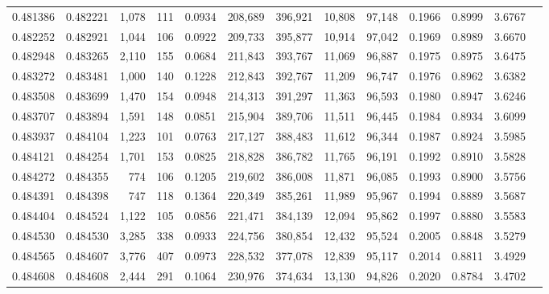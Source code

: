 \begin{tabular}{rrrrrrrrrrrrr}
0.481386 & 0.482221 & 1,078 &   111 &                                     0.0934 & 208,689 & 396,921 &  10,808 &  97,148 & 0.1966 & 0.8999 & 3.6767 \\
0.482252 & 0.482921 & 1,044 &   106 &                                     0.0922 & 209,733 & 395,877 &  10,914 &  97,042 & 0.1969 & 0.8989 & 3.6670 \\
0.482948 & 0.483265 & 2,110 &   155 &                                     0.0684 & 211,843 & 393,767 &  11,069 &  96,887 & 0.1975 & 0.8975 & 3.6475 \\
0.483272 & 0.483481 & 1,000 &   140 &                                     0.1228 & 212,843 & 392,767 &  11,209 &  96,747 & 0.1976 & 0.8962 & 3.6382 \\
0.483508 & 0.483699 & 1,470 &   154 &                                     0.0948 & 214,313 & 391,297 &  11,363 &  96,593 & 0.1980 & 0.8947 & 3.6246 \\
0.483707 & 0.483894 & 1,591 &   148 &                                     0.0851 & 215,904 & 389,706 &  11,511 &  96,445 & 0.1984 & 0.8934 & 3.6099 \\
0.483937 & 0.484104 & 1,223 &   101 &                                     0.0763 & 217,127 & 388,483 &  11,612 &  96,344 & 0.1987 & 0.8924 & 3.5985 \\
0.484121 & 0.484254 & 1,701 &   153 &                                     0.0825 & 218,828 & 386,782 &  11,765 &  96,191 & 0.1992 & 0.8910 & 3.5828 \\
0.484272 & 0.484355 &   774 &   106 &                                     0.1205 & 219,602 & 386,008 &  11,871 &  96,085 & 0.1993 & 0.8900 & 3.5756 \\
0.484391 & 0.484398 &   747 &   118 &                                     0.1364 & 220,349 & 385,261 &  11,989 &  95,967 & 0.1994 & 0.8889 & 3.5687 \\
0.484404 & 0.484524 & 1,122 &   105 &                                     0.0856 & 221,471 & 384,139 &  12,094 &  95,862 & 0.1997 & 0.8880 & 3.5583 \\
0.484530 & 0.484530 & 3,285 &   338 &                                     0.0933 & 224,756 & 380,854 &  12,432 &  95,524 & 0.2005 & 0.8848 & 3.5279 \\
0.484565 & 0.484607 & 3,776 &   407 &                                     0.0973 & 228,532 & 377,078 &  12,839 &  95,117 & 0.2014 & 0.8811 & 3.4929 \\
0.484608 & 0.484608 & 2,444 &   291 &                                     0.1064 & 230,976 & 374,634 &  13,130 &  94,826 & 0.2020 & 0.8784 & 3.4702 \\

\end{tabular}

